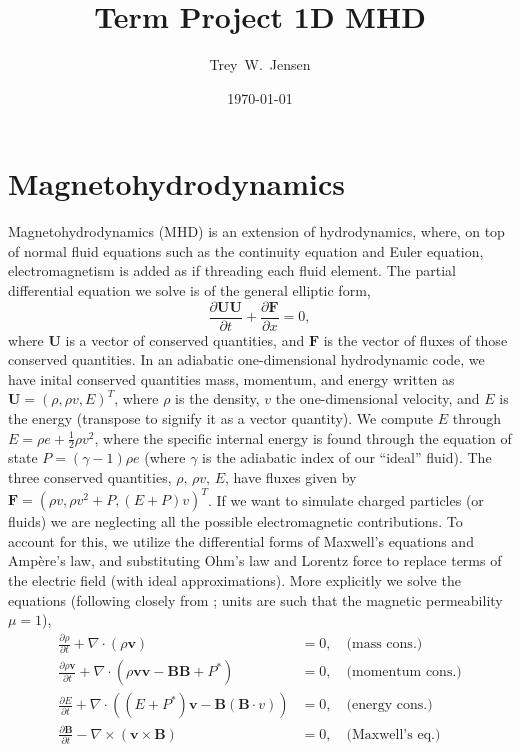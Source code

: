 \documentclass[iop,twocolumn]{emulateapj}
\newcommand{\p}[2]{\frac{\partial #1}{\partial #2}}
\begin{document}
\title{Term Project 1D MHD}

\author{
Trey~W.~Jensen
}

\date{\today}


\section{Magnetohydrodynamics}\label{sec:MHD}
Magnetohydrodynamics (MHD) is an extension of hydrodynamics, where, on top of normal fluid equations such as the continuity equation and Euler equation, electromagnetism is added as if threading each fluid element. The partial differential equation we solve is of the general elliptic form,
\begin{equation}
  \p{{\bm U} {\bm  U}}{t}+\p{{\bm F}}{x}=0 \label{eq:1},
\end{equation}
where ${\bm U}$ is a vector of conserved quantities, and ${\bm F}$ is the vector of fluxes of those conserved quantities. In an adiabatic one-dimensional hydrodynamic code, we have inital conserved quantities mass, momentum, and energy written as ${\bm U}=(\rho,\rho v,E)^T$, where $\rho$ is the density, $v$ the one-dimensional velocity, and $E$ is the energy (transpose to signify it as a vector quantity). We compute $E$ through $E=\rho e + \frac{1}{2}\rho v^2$, where the specific internal energy is found through the equation of state $P=(\gamma-1)\rho e$ (where $\gamma$ is the adiabatic index of our ``ideal'' fluid). The three conserved quantities, $\rho,\,\rho v,\,E$, have fluxes given by ${\bm F}=(\rho v,\rho v^2+P,(E+P)v)^T$.
If we want to simulate charged particles (or fluids) we are neglecting all the possible electromagnetic contributions. To account for this, we utilize the differential forms of Maxwell's equations and Amp{\`e}re's law, and substituting Ohm's law and Lorentz force to replace terms of the electric field (with ideal approximations). More explicitly we solve the equations (following closely from \cite{stone08a}; units are such that the magnetic permeability $\mu=1$),
\begin{align*}
  \p{\rho}{t}+\nabla\cdot(\rho{\bm v})&=0,\quad\textrm{(mass cons.)}\\
  \p{\rho{\bm v}}{t}+\nabla\cdot\left(\rho{\bm v}{\bm v}-{\bm B}{\bm B}+P^*\right)&=0,\quad\textrm{(momentum cons.)}\\
  \p{E}{t}+\nabla\cdot\left((E+P^*){\bm v}-{\bm B}({\bm B}\cdot v)\right)&=0,\quad\textrm{(energy cons.)}\\
  \p{{\bm B}}{t}-\nabla\times({\bm v}\times{\bm B})&=0,\quad\textrm{(Maxwell's eq.)}
\end{align*}
\end{document}
